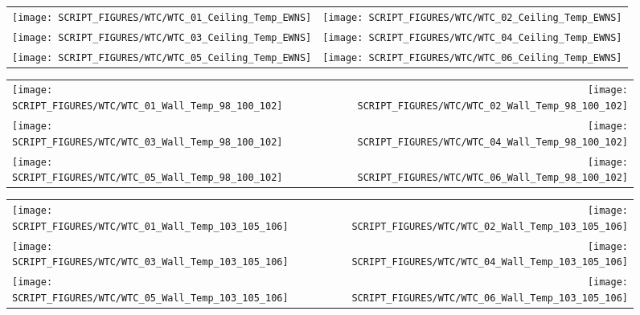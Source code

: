 \begin{figure}[p]
\begin{tabular*}{\textwidth}{l@{\extracolsep{\fill}}r}
\texttt{[image: SCRIPT\_FIGURES/WTC/WTC\_01\_Ceiling\_Temp\_EWNS]} &
\texttt{[image: SCRIPT\_FIGURES/WTC/WTC\_02\_Ceiling\_Temp\_EWNS]} \\
\texttt{[image: SCRIPT\_FIGURES/WTC/WTC\_03\_Ceiling\_Temp\_EWNS]} &
\texttt{[image: SCRIPT\_FIGURES/WTC/WTC\_04\_Ceiling\_Temp\_EWNS]} \\
\texttt{[image: SCRIPT\_FIGURES/WTC/WTC\_05\_Ceiling\_Temp\_EWNS]} &
\texttt{[image: SCRIPT\_FIGURES/WTC/WTC\_06\_Ceiling\_Temp\_EWNS]}
\end{tabular*}
\label{NIST_WTC_Ceiling_EWNS}
\end{figure}

\begin{figure}[p]
\begin{tabular*}{\textwidth}{l@{\extracolsep{\fill}}r}
\texttt{[image: SCRIPT\_FIGURES/WTC/WTC\_01\_Wall\_Temp\_98\_100\_102]} &
\texttt{[image: SCRIPT\_FIGURES/WTC/WTC\_02\_Wall\_Temp\_98\_100\_102]} \\
\texttt{[image: SCRIPT\_FIGURES/WTC/WTC\_03\_Wall\_Temp\_98\_100\_102]} &
\texttt{[image: SCRIPT\_FIGURES/WTC/WTC\_04\_Wall\_Temp\_98\_100\_102]} \\
\texttt{[image: SCRIPT\_FIGURES/WTC/WTC\_05\_Wall\_Temp\_98\_100\_102]} &
\texttt{[image: SCRIPT\_FIGURES/WTC/WTC\_06\_Wall\_Temp\_98\_100\_102]}
\end{tabular*}
\label{NIST_WTC_Wall_98_100_102}
\end{figure}

\begin{figure}[p]
\begin{tabular*}{\textwidth}{l@{\extracolsep{\fill}}r}
\texttt{[image: SCRIPT\_FIGURES/WTC/WTC\_01\_Wall\_Temp\_103\_105\_106]} &
\texttt{[image: SCRIPT\_FIGURES/WTC/WTC\_02\_Wall\_Temp\_103\_105\_106]} \\
\texttt{[image: SCRIPT\_FIGURES/WTC/WTC\_03\_Wall\_Temp\_103\_105\_106]} &
\texttt{[image: SCRIPT\_FIGURES/WTC/WTC\_04\_Wall\_Temp\_103\_105\_106]} \\
\texttt{[image: SCRIPT\_FIGURES/WTC/WTC\_05\_Wall\_Temp\_103\_105\_106]} &
\texttt{[image: SCRIPT\_FIGURES/WTC/WTC\_06\_Wall\_Temp\_103\_105\_106]}
\end{tabular*}
\label{NIST_WTC_Wall_103_105_106}
\end{figure}

